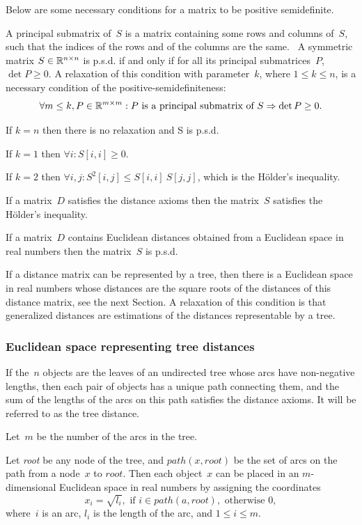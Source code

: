 \documentclass[10pt,a4paper]{article}
\begin{document}
Below are some necessary conditions for a matrix to be positive semidefinite.

A principal submatrix of~$S$ is a matrix containing some rows and columns of~$S$, such that the indices of the rows and of the columns are the same. \
A symmetric matrix $S \in \mathbb R^{n \times n}$ is p.s.d. if and only if for all its principal submatrices~$P$, $\det P \ge 0$.
A relaxation of this condition with parameter~$k$, where $1 \le k \le n$, is a necessary condition of the positive-semidefiniteness:
$$ \forall m \le k, P \in \mathbb R^{m \times m} : P \text { is a principal submatrix of } S \Rightarrow \det P \ge 0. $$

If $k = n$ then there is no relaxation and S is p.s.d.

If $k = 1$ then $\forall i : S[i,i] \ge 0$.

If $k = 2$ then $\forall i, j : S^2[i,j] \le S[i,i] \ S[j,j]$, which is the H\"older's inequality.

If a matrix~$D$ satisfies the distance axioms then the matrix~$S$ satisfies the H\"older's inequality.

If a matrix~$D$ contains Euclidean distances obtained from a Euclidean space in real numbers then the matrix~$S$ is p.s.d.

If a distance matrix can be represented by a tree, then there is a Euclidean space in real numbers
whose distances are the square roots of the distances of this distance matrix, see the next Section.
A relaxation of this condition is that generalized distances are estimations of the distances representable by a tree.


\subsubsection {Euclidean space representing tree distances}

If the~$n$ objects are the leaves of an undirected tree whose arcs have non-negative lengths,
then each pair of objects has a unique path connecting them, and the sum of the lengths of the arcs on this path satisfies the distance axioms.
It will be referred to as the tree distance.

Let~$m$ be the number of the arcs in the tree.

Let {\em root} be any node of the tree, and $path(x,root)$ be the set of arcs on the path from a node~$x$ to $root$.
Then each object~$x$ can be placed in an $m$-dimensional Euclidean space in real numbers by assigning the coordinates
$$ x_i = \sqrt{l_i}, \text { if } i \in path(a,root), \text { otherwise } 0, $$
where~$i$ is an arc, $l_i$ is the length of the arc, and $1 \le i \le m$.
\end{document}
